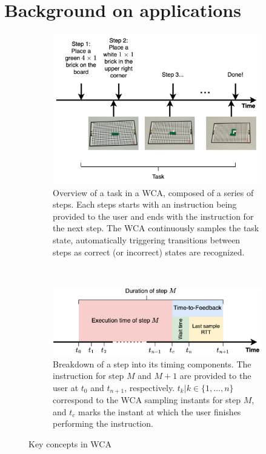 \section{Background on  applications}


\begin{figure}
    \centering
    \begin{subfigure}{\columnwidth}
        \centering
        \includegraphics[width=\columnwidth]{figs/task.png}
        \caption{%
            Overview of a task in a \ac{WCA}, composed of a series of steps.
            Each steps starts with an instruction being provided to the user and ends with the instruction for the next step.
            The \ac{WCA} continuously samples the task state, automatically triggering transitions between steps as correct (or incorrect) states are recognized.
        }\label{fig:task}
    \end{subfigure}\\
    \begin{subfigure}{\columnwidth}
        \centering
        \includegraphics[width=\columnwidth]{figs/step_time.png}
        \caption{%
            Breakdown of a step into its timing components.
            The instruction for step \( M \) and \( M + 1 \) are provided to the user at \( t_0 \) and \( t_{n+1} \), respectively.
            \( t_k | k \in \{1, \ldots, n \} \) correspond to the \ac{WCA} sampling instants for step \( M \), and \( t_c \) marks the instant at which the user finishes performing the instruction.
        }\label{fig:step}
    \end{subfigure}
    \caption{Key concepts in \acl{WCA}}
\end{figure}


